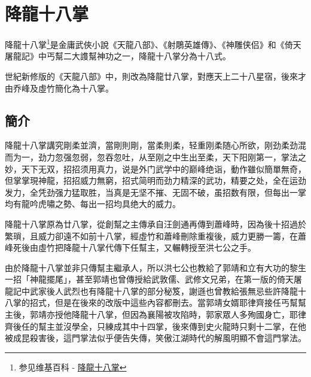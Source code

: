 \chapter{降龍十八掌}
降龍十八掌\footnote{参见维基百科 - \href{http://zh.wikipedia.org/wiki/\%E9\%99\%8D\%E9\%BE\%8D\%E5\%8D\%81\%E5\%85\%AB\%E6\%8E\%8C}{降龍十八掌}}是金庸武俠小說《天龍八部》、《射鵰英雄傳》、《神雕侠侣》\cite{shendiao}和《倚天屠龍記》\cite{yitian}中丐幫二大謢幫神功之一，降龍十八掌分為十八式。

世紀新修版的《天龍八部》中，則改為降龍廿八掌，對應天上二十八星宿，後來才由乔峰及虛竹簡化為十八掌。

\section{簡介}
降龍十八掌講究剛柔並濟，當剛則剛，當柔則柔，轻重刚柔随心所欲，刚劲柔劲混而为一，劲力忽强忽弱，忽吞忽吐，从至刚之中生出至柔，天下阳刚第一，掌法之妙，天下无双，招招须用真力，说是外门武学中的巅峰绝诣，動作雖似簡單無奇，但掌掌現神龍，招招威力無窮，招式简明而劲力精深的武功，精要之处，全在运劲发力，全凭劲强力猛取胜，当真是无坚不摧、无固不破，虽招数有限，但每出一掌均有龍吟虎嘯之勢、每出一招均具绝大的威力。

降龍十八掌原為廿八掌，從創幫之主傳承自汪劍通再傳到蕭峰時，因為後十招過於繁瑣，且威力卻遠不如前十八掌，經虛竹和蕭峰刪除重複後，威力更勝一籌，在蕭峰死後由虛竹把降龍十八掌代傳下任幫主，又輾轉授至洪七公之手。

由於降龍十八掌並非只傳幫主繼承人，所以洪七公也教給了郭靖和立有大功的黎生一招「神龍擺尾」，甚至郭靖也曾傳授給武敦儒、武修文兄弟，在第一版的倚天屠龍記中武家後人武烈也有降龍十八掌的部分秘笈，謝遜也曾教給張無忌些許降龍十八掌的招式，但是在後來的改版中這些內容都刪去。當郭靖女婿耶律齊接任丐幫幫主後，郭靖亦授他降龍十八掌，但因為襄陽被攻陷時，郭家眾人多殉國身亡，耶律齊後任的幫主並沒學全，只練成其中十四掌，後來傳到史火龍時只剩十二掌，在他被成昆殺害後，這門掌法似乎便告失傳，笑傲江湖時代的解風明顯不會這門掌法。

